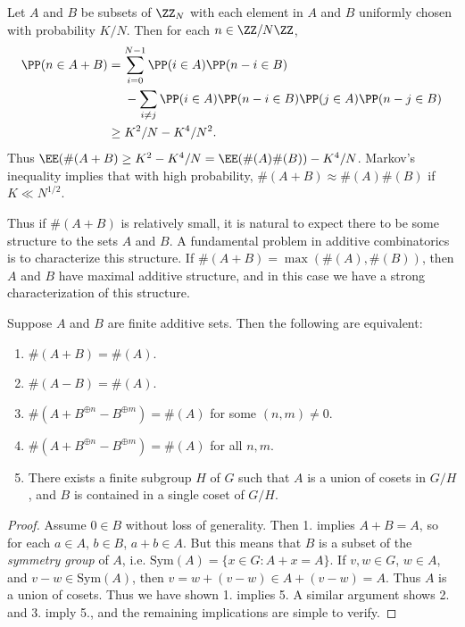 \begin{example}
    Let $A$ and $B$ be subsets of $\ZZ_N$ with each element in $A$ and $B$ uniformly chosen with probability $K/N$. Then for each $n \in \ZZ / N \ZZ$,
    \begin{align*}
        \PP(n \in A + B) &= \sum_{i = 0}^{N-1} \PP(i \in A) \PP(n-i \in B)\\
        &\ \ \ \ - \sum_{i \neq j} \PP(i \in A) \PP(n-i \in B) \PP(j \in A) \PP(n-j \in B)\\
        &\geq K^2/N - K^4/N^2.
    \end{align*}
    Thus $\EE(\#(A + B) \geq K^2 - K^4/N = \EE(\#(A) \#(B)) - K^4/N$. Markov's inequality implies that with high probability, $\#(A + B) \approx \#(A) \#(B)$ if $K \ll N^{1/2}$.
\end{example}

Thus if $\#(A+B)$ is relatively small, it is natural to expect there to be some structure to the sets $A$ and $B$. A fundamental problem in additive combinatorics is to characterize this structure. If $\#(A + B) = \max(\#(A), \#(B))$, then $A$ and $B$ have maximal additive structure, and in this case we have a strong characterization of this structure.

\begin{theorem}
    Suppose $A$ and $B$ are finite additive sets. Then the following are equivalent:
    \begin{enumerate}
        \item $\#(A + B) = \#(A)$.
        \item $\#(A - B) = \#(A)$.
        \item $\#(A + B^{\oplus n} - B^{\oplus m}) = \#(A)$ for some $(n,m) \neq 0$.
        \item $\#(A + B^{\oplus n} - B^{\oplus m}) = \#(A)$ for all $n,m$.
        \item There exists a finite subgroup $H$ of $G$ such that $A$ is a union of cosets in $G/H$, and $B$ is contained in a single coset of $G/H$. 
    \end{enumerate}
\end{theorem}
\begin{proof}
    Assume $0 \in B$ without loss of generality. Then 1. implies $A + B = A$, so for each $a \in A$, $b \in B$, $a + b \in A$. But this means that $B$ is a subset of the \emph{symmetry group} of $A$, i.e. $\text{Sym}(A) = \{ x \in G : A + x = A \}$. If $v,w \in G$, $w \in A$, and $v - w \in \text{Sym}(A)$, then $v = w + (v - w) \in A + (v - w) = A$. Thus $A$ is a union of cosets. Thus we have shown 1. implies 5. A similar argument shows 2. and 3. imply 5., and the remaining implications are simple to verify.
\end{proof}

